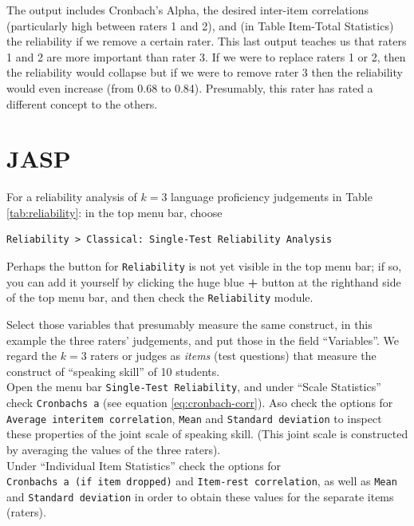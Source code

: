 \documentclass[
]{book}
\begin{document}
The output includes Cronbach's Alpha, the desired inter-item correlations
(particularly high between raters 1 and 2), and (in Table
Item-Total Statistics) the reliability if we remove a certain
rater. This last output teaches us that
raters 1 and 2 are more important than rater 3. If we
were to replace raters 1 or 2, then the reliability would collapse
but if we were to remove rater 3 then the reliability
would even increase (from 0.68 to 0.84). Presumably, this rater
has rated a different concept to the others.

\hypertarget{jasp-10}{%
\section{JASP}\label{jasp-10}}

For a reliability analysis of \(k=3\) language proficiency
judgements in Table \ref{tab:reliability}: in the top menu bar, choose\\

\begin{verbatim}
Reliability > Classical: Single-Test Reliability Analysis
\end{verbatim}

Perhaps the button for \texttt{Reliability} is not yet visible in the top menu bar; if so, you can add it yourself by clicking the huge blue \textbf{+} button at the righthand side of the top menu bar, and then check the \texttt{Reliability} module.

Select those variables that presumably measure the same construct, in this example the three raters' judgements, and put those in the field ``Variables''. We regard the \(k=3\) raters or judges as \emph{items} (test questions) that measure the construct of ``speaking skill'' of 10 students.\\
Open the menu bar \texttt{Single-Test\ Reliability}, and under ``Scale Statistics'' check \texttt{Cronbach\textquotesingle{}s\ a} (see equation \eqref{eq:cronbach-corr}). Aso check the options for \texttt{Average\ interitem\ correlation}, \texttt{Mean} and \texttt{Standard\ deviation} to inspect these properties of the joint scale of speaking skill. (This joint scale is constructed by averaging the values of the three raters).\\
Under ``Individual Item Statistics'' check the options for \texttt{Cronbach\textquotesingle{}s\ a\ (if\ item\ dropped)} and \texttt{Item-rest\ correlation}, as well as \texttt{Mean} and \texttt{Standard\ deviation} in order to obtain these values for the separate items (raters).
\end{document}
